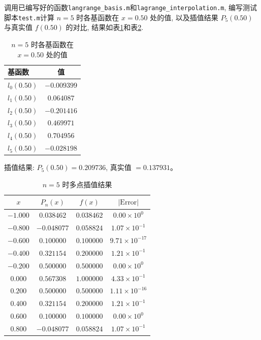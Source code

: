 \documentclass[zihao=-4,a4paper]{ctexart}
\begin{document}
调用已编写好的函数\verb|langrange_basis.m|和\verb|lagrange_interpolation.m|, 编写测试脚本\verb|test.m|计算 $n=5$ 时各基函数在 $x=0.50$ 处的值, 以及插值结果 $P_5(0.50)$ 与真实值 $f(0.50)$ 的对比, 结果如表\ref{tab:basis_values}和表\ref{tab:multi_interp}.
\begin{table}[htbp]
\centering
\caption{$n=5$ 时各基函数在 $x=0.50$ 处的值}
\label{tab:basis_values}
\begin{tabular}{lc}
\toprule
基函数 & 值 \\
\midrule
$l_0(0.50)$ & $-0.009399$ \\
$l_1(0.50)$ & $0.064087$ \\
$l_2(0.50)$ & $-0.201416$ \\
$l_3(0.50)$ & $0.469971$ \\
$l_4(0.50)$ & $0.704956$ \\
$l_5(0.50)$ & $-0.028198$ \\
\bottomrule
\end{tabular}
\par\medskip
\noindent 插值结果: $P_5(0.50)=0.209736$, 真实值 $=0.137931$。
\end{table}

\begin{table}[htbp]
\centering
\caption{$n=5$ 时多点插值结果}
\label{tab:multi_interp}
\begin{tabular}{cccc}
\toprule
$x$ & $P_n(x)$ & $f(x)$ & $|\text{Error}|$ \\
\midrule
$-1.000$ & $0.038462$ & $0.038462$ & $0.00\times10^{0}$ \\
$-0.800$ & $-0.048077$ & $0.058824$ & $1.07\times10^{-1}$ \\
$-0.600$ & $0.100000$ & $0.100000$ & $9.71\times10^{-17}$ \\
$-0.400$ & $0.321154$ & $0.200000$ & $1.21\times10^{-1}$ \\
$-0.200$ & $0.500000$ & $0.500000$ & $0.00\times10^{0}$ \\
$0.000$ & $0.567308$ & $1.000000$ & $4.33\times10^{-1}$ \\
$0.200$ & $0.500000$ & $0.500000$ & $1.11\times10^{-16}$ \\
$0.400$ & $0.321154$ & $0.200000$ & $1.21\times10^{-1}$ \\
$0.600$ & $0.100000$ & $0.100000$ & $0.00\times10^{0}$ \\
$0.800$ & $-0.048077$ & $0.058824$ & $1.07\times10^{-1}$ \\
\bottomrule
\end{tabular}
\end{table}
\end{document}
